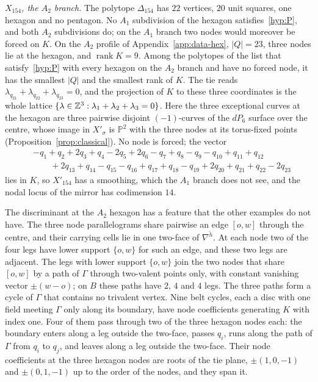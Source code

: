 \emph{$X_{154}$, the $A_2$ branch.} The polytope $\Delta_{154}$ has $22$ vertices, $20$ unit squares, one hexagon and no
pentagon. No $A_1$ subdivision of the hexagon satisfies~\ref{hyp:P}, and both $A_2$ subdivisions do; on the $A_1$ branch two nodes
would moreover be forced on $K$. On the $A_2$ profile of Appendix~\ref{app:data-hex}, $|Q|=23$, three nodes lie at the
hexagon, and $\operatorname{rank}K=9$. Among the polytopes of the list that satisfy~\ref{hyp:P} with every hexagon on the
$A_2$ branch and have no forced node, it has the smallest $|Q|$ and the smallest rank of $K$. The tie reads
$\lambda_{q_{21}}+\lambda_{q_{22}}+\lambda_{q_{23}}=0$, and the projection of $K$ to these three coordinates is the whole
lattice $\{\lambda\in\mathbb Z^3:\lambda_1+\lambda_2+\lambda_3=0\}$. Here the three exceptional curves at the hexagon are three
pairwise disjoint $(-1)$-curves of the $dP_6$ surface over the centre, whose image in $X'_\sigma$ is $\mathbb P^2$ with the
three nodes at its torus-fixed points (Proposition~\ref{prop:classical}). No node is forced; the vector
\[
\begin{aligned}
&-q_1+q_2+2q_3+q_4-2q_5+2q_6-q_7+q_8-q_9-q_{10}+q_{11}+q_{12}\\
&\qquad+2q_{13}+q_{14}-q_{15}-q_{16}+q_{17}+q_{18}-q_{19}+2q_{20}+q_{21}+q_{22}-2q_{23}
\end{aligned}
\]
lies in $K$, so $X'_{154}$ has a smoothing, which the $A_1$ branch does not see, and the nodal locus of the mirror has
codimension $14$.

The discriminant at the $A_2$ hexagon has a feature that the other examples do not have. The three node parallelograms
share pairwise an edge $[o,w]$ through the centre, and their carrying cells lie in one two-face of $\nabla^{\check h}$. At
each node two of the four legs have lower support $\{o,w\}$ for such an edge, and these two legs are adjacent. The legs
with lower support $\{o,w\}$ join the two nodes that share $[o,w]$ by a path of $\Gamma$ through two-valent points only,
with constant vanishing vector $\pm(w-o)$; on $B$ these paths have $2$, $4$ and $4$ legs. The three paths form a cycle of
$\Gamma$ that contains no trivalent vertex. Nine belt cycles, each a disc with one field meeting $\Gamma$ only along its
boundary, have node coefficients generating $K$ with index one. Four of
them pass through two of the three hexagon nodes each: the boundary enters along a leg outside the two-face, passes
$q_i$, runs along the path of $\Gamma$ from $q_i$ to $q_j$, and leaves along a leg outside the two-face. Their node
coefficients at the three hexagon nodes are roots of the tie plane, $\pm(1,0,-1)$ and $\pm(0,1,-1)$ up to the order of
the nodes, and they span it.

